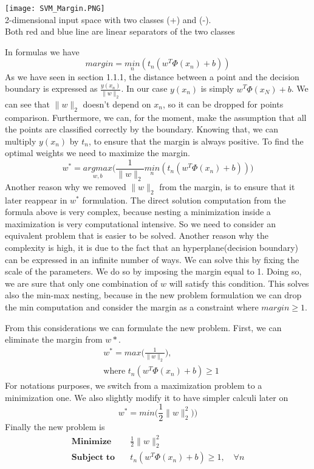 \documentclass[main.tex]{subfiles}
\begin{document}
\begin{center}
    \texttt{[image: SVM\_Margin.PNG]} \\
    2-dimensional input space with two classes (+) and (-). \\
    Both red and blue line are linear separators of the two classes
\end{center}
In formulas we have
\begin{equation}
    margin = \underset{n}{min} (t_n (w^T \Phi(x_n) + b))
\end{equation}
As we have seen in section 1.1.1, the distance between a point and the decision boundary is expressed as $\frac{y(x_n)}{\|w\|_2}$. In our case $y(x_n)$ is simply $w^T\Phi(x_N) + b$. We can see that $\|w\|_2$ doesn't depend on $x_n$, so it can be dropped for points comparison. Furthermore, we can, for the moment, make the assumption that all the points are classified correctly by the boundary. Knowing that, we can multiply $y(x_n)$ by $t_n$, to ensure that the margin is always positive.
\newline
To find the optimal weights we need to maximize the margin.
\begin{equation*}
    w^* = \underset{w,b}{argmax} \bigg( \frac{1}{\|w\|_2} \underset{n}{min} (t_n (w^T \Phi(x_n) + b)) \bigg)
\end{equation*}
Another reason why we removed $\|w\|_2$ from the margin, is to ensure that it later reappear in $w^*$ formulation.
The direct solution computation from the formula above is very complex, because nesting a minimization inside a maximization is very computational intensive. So we need to consider an equivalent problem that is easier to be solved. Another reason why the complexity is high, it is due to the fact that an hyperplane(decision boundary) can be expressed in an infinite number of ways\footnotemark. We can solve this by fixing the scale of the parameters. We do so by imposing the margin equal to 1. Doing so, we are sure that only one combination of $w$ will satisfy this condition. This solves also the min-max nesting, because in the new problem formulation we can drop the min computation and consider the margin as a constraint where $margin \geq 1$.

From this considerations we can formulate the new problem. First, we can eliminate the margin from $w*$.
\begin{align*}
    &w^* = max \bigg( \frac{1}{\|w\|_2} \bigg), \\
    &\text{where } t_n (w^T \Phi(x_n) + b) \geq 1
\end{align*}
For notations purposes, we switch from a maximization problem to a minimization one. We also slightly modify it to have simpler calculi later on
\begin{equation*}
    w^* = min \bigg( \frac{1}{2} \|w\|_2^2) \bigg)
\end{equation*}
Finally the new problem is
\begin{align*}
    \textbf{Minimize} \quad &\frac{1}{2} \|w\|_2^2 \\
    \textbf{Subject to} \quad &t_n (w^T \Phi(x_n) + b) \geq 1, \quad \forall n
\end{align*}
\end{document}
